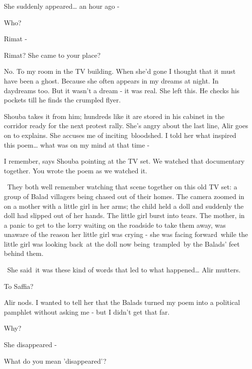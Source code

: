 \documentclass[letterpaper]{article}
\begin{document}
{\textquotedbl}She suddenly appeared{\dots} an hour ago -{\textquotedbl} 

{\textquotedbl}Who?{\textquotedbl} 

{\textquotedbl}Rimat -{\textquotedbl} 

{\textquotedbl}Rimat? She came to your place?{\textquotedbl} 

{\textquotedbl}No. To my room in the TV building. When she'd gone I thought that it must have been a ghost. Because she
often appears in my dreams at night. In daydreams too. But it wasn't a dream - it was real. She left
this.{\textquotedbl} He checks his pockets till he finds the crumpled flyer.

Shouba takes it from him; hundreds like it are stored in his cabinet in the corridor ready for the next protest rally.
{\textquotedbl}She's angry about the last line,{\textquotedbl} Alir goes on to explains. {\textquotedbl}She accuses me
of inciting~bloodshed. I told her what inspired this poem{\dots} what was on my mind at that time -{\textquotedbl}

{\textquotedbl}I remember,{\textquotedbl} says Shouba pointing at the TV set. {\textquotedbl}We watched that documentary
together. You wrote the poem as we watched it.{\textquotedbl} 

\ They both well remember watching that scene together on this old TV set: a group of Balad villagers being chased out
of their homes. The camera zoomed in on a mother with a little girl in her arms; the child held a doll and suddenly the
doll had slipped out of her hands. The little girl burst into tears. The mother, in a panic to get to the lorry waiting
on the roadside to take them away, was unaware of the reason her little girl was crying - she was facing forward~while
the little girl was looking back~at the doll now being~trampled~by the Balads' feet behind them.

~{\textquotedbl}She said~it was these kind of words that led to what happened{\dots}{\textquotedbl} Alir mutters.

{\textquotedbl}To Saffia?{\textquotedbl} 

Alir nods. {\textquotedbl}I wanted to tell her that the Balads turned my poem into a political pamphlet without asking
me - but I didn't get that far.{\textquotedbl} 

{\textquotedbl}Why?{\textquotedbl} 

{\textquotedbl}She disappeared -{\textquotedbl} 

{\textquotedbl}What do you mean 'disappeared'?{\textquotedbl} 
\end{document}
